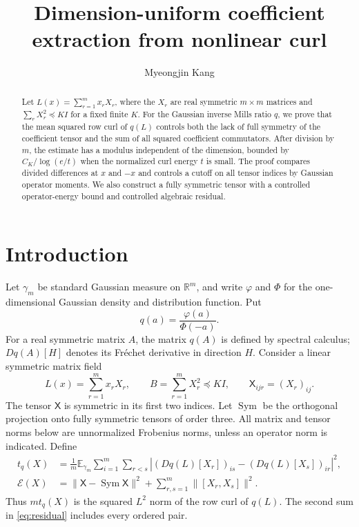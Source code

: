 \documentclass[11pt,reqno]{amsart}
\title[Coefficient extraction from nonlinear curl]{Dimension-uniform coefficient extraction from nonlinear curl}
\author{Myeongjin Kang}
\date{}
\numberwithin{equation}{section}
\theoremstyle{remark}
\newcommand{\E}{\mathbb E}
\newcommand{\R}{\mathbb R}
\newcommand{\X}{\mathsf X}
\DeclareMathOperator{\Sym}{Sym}
\begin{document}
\begin{abstract}
Let $L(x)=\sum_{r=1}^m x_rX_r$, where the $X_r$ are real symmetric
$m\times m$ matrices and $\sum_rX_r^2\preceq KI$ for a fixed finite $K$.
For the Gaussian inverse Mills ratio $q$, we prove that the mean squared
row curl of $q(L)$ controls both the lack of full symmetry of the
coefficient tensor and the sum of all squared coefficient commutators.
After division by $m$, the estimate has a modulus independent of the
dimension, bounded by $C_K/\log(e/t)$ when the normalized curl energy
$t$ is small. The proof compares divided differences at $x$ and $-x$
and controls a cutoff on all tensor indices by Gaussian operator
moments. We also construct a fully symmetric tensor with a controlled
operator-energy bound and controlled algebraic residual.
\end{abstract}
\maketitle

\section{Introduction}
Let $\gamma_m$ be standard Gaussian measure on $\R^m$, and write
$\varphi$ and $\Phi$ for the one-dimensional Gaussian density and
distribution function. Put
\[
 q(a)=\frac{\varphi(a)}{\Phi(-a)}.
\]
For a real symmetric matrix $A$, the matrix $q(A)$ is defined by spectral
calculus; $Dq(A)[H]$ denotes its Fr\'echet derivative in direction $H$.
Consider a linear symmetric matrix field
\begin{equation}\label{eq:field}
 L(x)=\sum_{r=1}^m x_rX_r,\qquad
 B=\sum_{r=1}^m X_r^2\preceq KI,\qquad
 \X_{ijr}=(X_r)_{ij}.
\end{equation}
The tensor $\X$ is symmetric in its first two indices. Let $\Sym$
be the orthogonal projection onto fully symmetric tensors of order
three. All matrix and tensor norms below are unnormalized Frobenius
norms, unless an operator norm is indicated. Define
\begin{align}
 t_q(X)&=\frac1m\E_{\gamma_m}\sum_{i=1}^m\sum_{r<s}
 \left|(Dq(L)[X_r])_{is}-(Dq(L)[X_s])_{ir}\right|^2,\label{eq:curl}\\
 \mathcal E(X)&=\|\X-\Sym\X\|^2+
                 \sum_{r,s=1}^m\|[X_r,X_s]\|^2.\label{eq:residual}
\end{align}
Thus $mt_q(X)$ is the squared $L^2$ norm of the row curl of $q(L)$.
The second sum in \eqref{eq:residual} includes every ordered pair.
\end{document}
